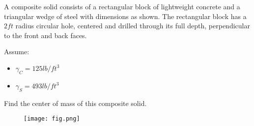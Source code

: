 
A composite solid consists of a rectangular block of lightweight concrete and a triangular wedge of steel with dimensions as shown. The rectangular block has a $2 ft$ radius circular hole, centered and drilled through its full depth, perpendicular to the front and back faces.

Assume:
\begin{itemize}
  \item $\gamma_C = 125 lb/ft^3$
  \item $\gamma_S = 493 lb/ft^3$
\end{itemize}

Find the center of mass of this composite solid.

\begin{figure}[ht!]
  \centering
  \texttt{[image: fig.png]}
\end{figure}

\iftoggle{flagSoln}{%
\vspace{.5cm}
\rule{\textwidth}{.4pt}
\vspace{.5cm}
\textbf{Solution:}
\begin{figure}[ht!]
  \centering
  \texttt{[image: soln.png]}
\end{figure}
}{%
}%
